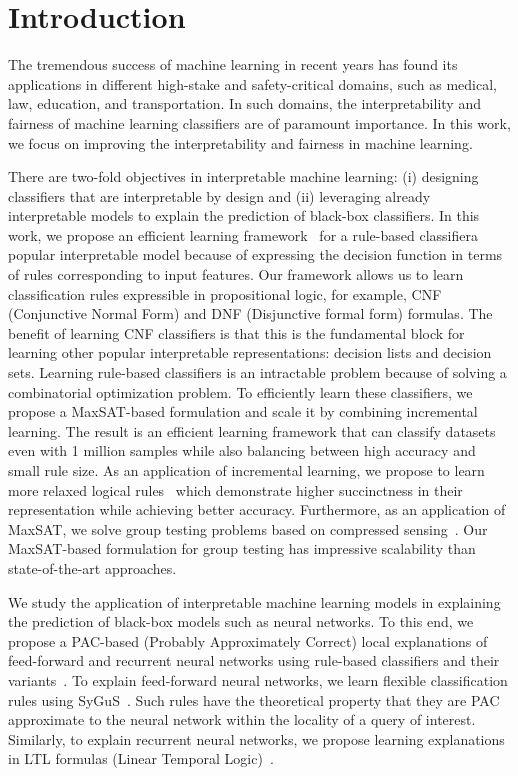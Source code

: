 \section{Introduction}
The tremendous success of machine learning in recent years has found its applications in different high-stake and  safety-critical domains, such as medical, law, education, and transportation. In such domains, the interpretability and fairness of machine learning classifiers are of paramount importance. In this work, we focus on improving the interpretability and fairness in machine learning. 

There are two-fold objectives in interpretable machine learning: (i) designing classifiers that are interpretable by design and (ii) leveraging already interpretable models to explain the prediction of black-box classifiers. In this work, we propose an efficient learning framework~\cite{ghosh19incremental} for a rule-based classifier\textemdash a popular interpretable model because of expressing the decision function in terms of rules corresponding to input features.  Our framework allows us to learn classification rules expressible in propositional logic, for example, CNF (Conjunctive Normal Form) and DNF (Disjunctive formal form) formulas.  The benefit of learning CNF classifiers is that this is the fundamental block for learning other popular interpretable representations: decision lists and decision sets. Learning rule-based classifiers is an intractable problem because of solving a combinatorial optimization problem. To efficiently learn these classifiers, we propose a MaxSAT-based formulation and scale it by combining incremental learning. The result is an efficient learning framework that can classify datasets even with 1 million samples while also balancing between high accuracy and small rule size. As an application of incremental learning, we propose to learn more relaxed logical rules~\cite{ghosh20classification} which demonstrate higher succinctness in their representation while achieving better accuracy. Furthermore, as an application of MaxSAT, we solve group testing problems based on compressed sensing~\cite{ciampiconi20maxsat}. Our MaxSAT-based formulation for group testing has impressive scalability than state-of-the-art approaches. 



We study the application of interpretable machine learning models in explaining the prediction of black-box models such as neural networks. To this end, we propose a PAC-based (Probably Approximately Correct) local explanations of feed-forward and recurrent neural networks using rule-based classifiers and their variants~\cite{neider2020probably,ghosh2020formal}. To explain feed-forward neural networks, we learn flexible classification rules using SyGuS~\cite{neider2020probably}. Such rules have the theoretical property that they are PAC approximate to the neural network within the locality of a query of interest. Similarly, to explain recurrent neural networks, we propose learning explanations in LTL formulas (Linear Temporal Logic)~\cite{ghosh2020formal}. 


